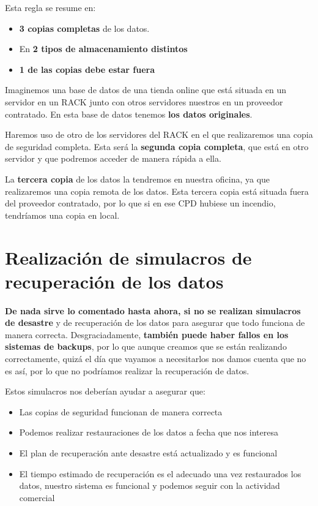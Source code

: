 Esta regla se resume en:
\begin{itemize}
    \item \textbf{3 copias completas} de los datos.
    \item En \textbf{2 tipos de almacenamiento distintos}
    \item \textbf{1 de las copias debe estar fuera}
\end{itemize}

Imaginemos una base de datos de una tienda online que está situada en un servidor en un RACK junto con otros servidores nuestros en un proveedor contratado. En esta base de datos tenemos \textbf{los datos originales}.

Haremos uso de otro de los servidores del RACK en el que realizaremos una copia de seguridad completa. Esta será la \textbf{segunda copia completa}, que está en otro servidor y que podremos acceder de manera rápida a ella.

La \textbf{tercera copia} de los datos la tendremos en nuestra oficina, ya que realizaremos una copia remota de los datos. Esta tercera copia está situada fuera del proveedor contratado, por lo que si en ese CPD hubiese un incendio, tendríamos una copia en local.


\section{Realización de simulacros de recuperación de los datos}
\textbf{De nada sirve lo comentado hasta ahora, si no se realizan simulacros de desastre} y de recuperación de los datos para asegurar que todo funciona de manera correcta. Desgraciadamente, \textbf{también puede haber fallos en los sistemas de backups}, por lo que aunque creamos que se están realizando correctamente, quizá el día que vayamos a necesitarlos nos damos cuenta que no es así, por lo que no podríamos realizar la recuperación de datos.


Estos simulacros nos deberían ayudar a asegurar que:

\begin{itemize}
    \item Las copias de seguridad funcionan de manera correcta
    \item Podemos realizar restauraciones de los datos a fecha que nos interesa
    \item El plan de recuperación ante desastre está actualizado y es funcional
    \item El tiempo estimado de recuperación es el adecuado
    una vez restaurados los datos, nuestro sistema es funcional y podemos seguir con la actividad comercial
\end{itemize}




\clearpage